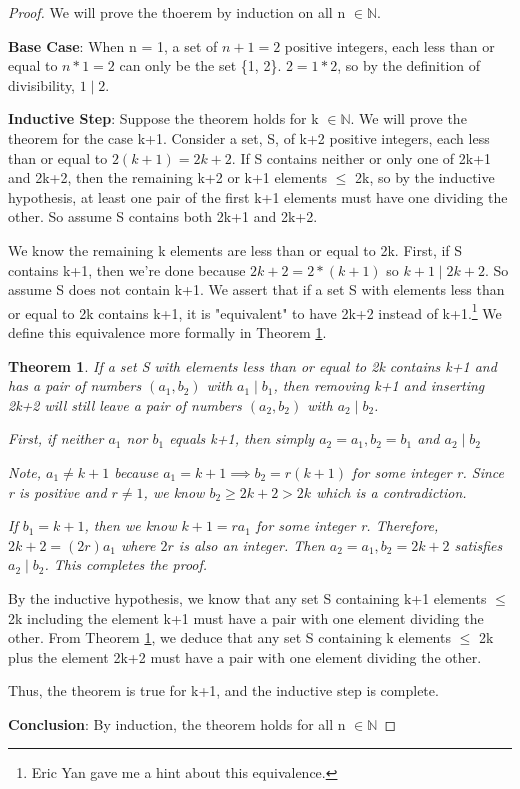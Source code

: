 \documentclass[11pt]{article}
\newtheorem{theorem}{Theorem}
\theoremstyle{definition}
\theoremstyle{case}
\begin{document}
\begin{proof}
    We will prove the thoerem by induction on all n $\in \mathbb{N}$.
    
    \textbf{Base Case}: When n = 1, a set of $n + 1 = 2$ positive integers, each less than or equal to $n*1 = 2$ can only be the set \{1, 2\}.
    $2 = 1*2$, so by the definition of divisibility, $1 \mid 2$.
    
    \textbf{Inductive Step}: Suppose the theorem holds for k $\in \mathbb{N}$. 
    We will prove the theorem
    for the case k+1. Consider a set, S, of k+2 positive integers, each less 
    than or equal to $2(k+1) = 2k + 2$. 
    If S contains neither or only one of 2k+1 and 2k+2, then the remaining k+2 or k+1 elements
    $\leq$ 2k, so by the inductive hypothesis, at least one pair of the first k+1 elements
    must have one dividing the other. So assume S contains both 2k+1 and 2k+2.

    We know the remaining k elements are less 
    than or equal to 2k. First, if S contains k+1, then we're done because
    $2k+2 = 2*(k+1)$ so $k+1 \mid 2k+2$. So assume S does not contain k+1.
    We assert that if a set S with elements less than or equal to 2k contains k+1, 
    it is "equivalent" to have 2k+2 instead of k+1.\footnote{Eric Yan gave me a hint 
    about this equivalence.} We define this equivalence more
    formally in Theorem \ref{switcheroo}.
    \begin{theorem}
        \label{switcheroo}
    If a set S with elements less than or equal to 2k contains k+1 
    and has a pair of
    numbers $(a_1, b_2)$ with $a_1 \mid b_1$, then removing k+1 and inserting 2k+2 will 
    still leave a pair of numbers $(a_2, b_2)$ with $a_2 \mid b_2$.
    
    First, if neither $a_1$ nor $b_1$ equals k+1, then simply $a_2 = a_1, b_2 = b_1$ and $a_2 \mid b_2$
    
    Note, $a_1 \neq k + 1$ because $a_1 = k + 1 \implies b_2 = r(k+1)$ for some integer r.
    Since r is positive and $r \neq 1$, we know $b_2 \geq 2k+2 > 2k$
    which is a contradiction.

    If $b_1 = k+1$, then we know $k+1 = ra_1$ for some integer r. Therefore, $2k+2 = (2r)a_1$ where $2r$
    is also an integer. Then $a_2 = a_1, b_2 = 2k+2$ satisfies $a_2 \mid b_2$. This completes the proof.
    \end{theorem}
    By the inductive hypothesis, we know that any set S containing k+1 elements $\leq$ 2k including the element k+1
    must have a pair with one element dividing the other. From Theorem \ref{switcheroo}, we deduce that
    any set S containing k elements $\leq$ 2k plus the element 2k+2 must have a pair with one 
    element dividing the other.

    Thus, the theorem is true for k+1, and the inductive step is complete.
        
    \textbf{Conclusion}: By induction, the theorem holds for all n $\in \mathbb{N}$
    
\end{proof}
\end{document}
